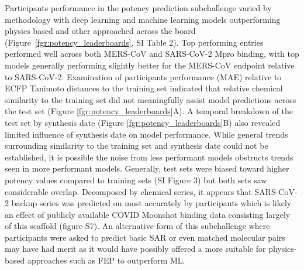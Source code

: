 \documentclass[journal=jcim,manuscript=article]{achemso}
\begin{document}
Participants performance in the potency prediction subchallenge varied by methodology with deep learning and machine learning models outperforming physics based and other approached across the board (Figure~\ref{fgr:potency_leaderboards}, SI Table 2). Top performing entries performed well across both MERS-CoV and SARS-CoV-2 Mpro binding, with top models generally performing slightly better for the MERS-CoV endpoint relative to SARS-CoV-2. Examination of participants performance (MAE) relative to ECFP Tanimoto distances to the training set indicated that relative chemical similarity to the training set did not meaningfully assist model predictions across the test set (Figure \ref{fgr:potency_leaderboards}A). A temporal breakdown of the test set by synthesis date (Figure \ref{fgr:potency_leaderboards}B) also revealed limited influence of synthesis date on model performance. While general trends surrounding similarity to the training set and synthesis date could not be established, it is possible the noise from less performant models obstructs trends seen in more performant models. Generally, test sets were biased toward higher potency values compared to training sets (SI Figure 3) but both sets saw considerable overlap. Decomposed by chemical series, it appears that SARS-CoV-2 backup series was predicted on most accurately by participants which is likely an effect of publicly available COVID Moonshot binding data consisting largely of this scaffold (figure S7). An alternative form of this subchallenge where participants were asked to predict basic SAR or even matched molecular pairs may have had merit as it would have possibly offered a more suitable for physics-based approaches such as FEP to outperform ML.
\end{document}
